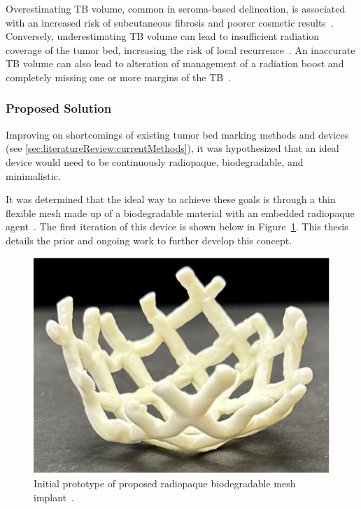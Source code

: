 Overestimating TB volume, common in seroma-based delineation, is associated with an increased risk of subcutaneous fibrosis and poorer cosmetic results~\cite{RefWorks:RefID:197-den2015postlumpectomy}. Conversely, underestimating TB volume can lead to insufficient radiation coverage of the tumor bed, increasing the risk of local recurrence~\cite{RefWorks:RefID:198-jiao2024interobserver}. An inaccurate TB volume can
also lead to alteration of management of a radiation boost and completely missing one or more margins of the TB~\cite{RefWorks:RefID:344-mitchell2019adaptable}.

\subsubsection{Proposed Solution\label{sec:introduction:motivation:proposedsolution}}
Improving on shortcomings of existing tumor bed marking methods and devices (see \ref{sec:literatureReview:currentMethods}), it was hypothesized that an ideal device would need to be continuously radiopaque, biodegradable, and minimalistic.

It was determined that the ideal way to achieve these goals is through a thin flexible mesh made up of a biodegradable material with an embedded radiopaque agent~\cite{RefWorks:RefID:372-krakovskytumor}. The first iteration of this device is shown below in Figure~\ref{fig:introduction:initialCapstonePrototype}. This thesis details the prior and ongoing work to further develop this concept.

\begin{figure}[h!]
        \centering
        \includegraphics[width=0.6\linewidth]{../figs/introduction/initial_capstone_prototype.png}
        \caption{Initial prototype of proposed radiopaque biodegradable mesh implant~\cite{RefWorks:RefID:372-krakovskytumor}.}
        \label{fig:introduction:initialCapstonePrototype}
\end{figure}
